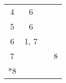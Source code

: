 \begin{figure}[btp]
{\begin{tabular}{cccc}
\hspace{\starlen}4      & 6          &      &       \\
\hspace{\starlen}5      & 6          &      &       \\
\hspace{\starlen}6      & 1, 7       &      &       \\
\hspace{\starlen}7      &            &      & 8     \\
                *8      &            &      &       \\
\bottomrule
\end{tabular}
}%
\end{figure}
